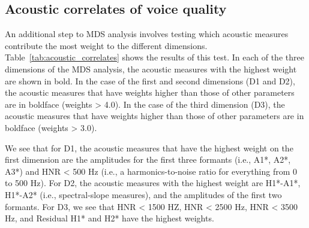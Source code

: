 \subsection{Acoustic correlates of voice quality} \label{sec:acousticlandscape:correlates}

An additional step to MDS analysis involves testing which acoustic measures contribute the most weight to the different dimensions. Table~\ref{tab:acoustic_correlates} shows the results of this test. In each of the three dimensions of the MDS analysis, the acoustic measures with the highest weight are shown in bold. In the case of the first and second dimensions (D1 and D2), the acoustic measures that have weights higher than those of other parameters are in boldface (weights > 4.0). In the case of the third dimension (D3), the acoustic measures that have weights higher than those of other parameters are in boldface (weights > 3.0). 

We see that for D1, the acoustic measures that have the highest weight on the first dimension are the amplitudes for the first three formants (i.e., A1*, A2*, A3*) and HNR < 500 Hz (i.e., a harmonics-to-noise ratio for everything from 0 to 500 Hz). For D2, the acoustic measures with the highest weight are H1*-A1*, H1*-A2* (i.e., spectral-slope measures), and the amplitudes of the first two formants. For D3, we see that HNR < 1500 HZ, HNR < 2500 Hz, HNR < 3500 Hz, and Residual H1* and H2* have the highest weights.

